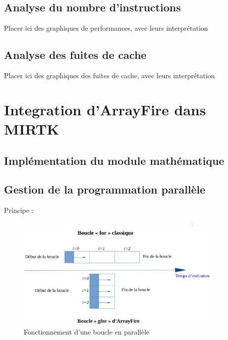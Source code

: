 \documentclass[10pt]{report}
\begin{document}
	\subsection{Analyse du nombre d'instructions}
	
	Placer ici des graphiques de performances, avec leurs interprétation
	\subsection{Analyse des fuites de cache}
	
	Placer ici des graphiques des fuites de cache, avec leurs interprétation
	
	\section{Integration d'ArrayFire dans MIRTK}
	\subsection{Implémentation du module mathématique}
	\subsection{Gestion de la programmation parallèle}
Principe :
	\begin{figure}[h!]
		\begin{center}
			\includegraphics[width=10cm]{Reports/figures/gfor.eps}
		\end{center}	
		\caption{Fonctionnement d'une boucle en parallèle}
		\label{Fonctionnement d'une boucle en parallèle}
	\end{figure}
	
\end{document}
